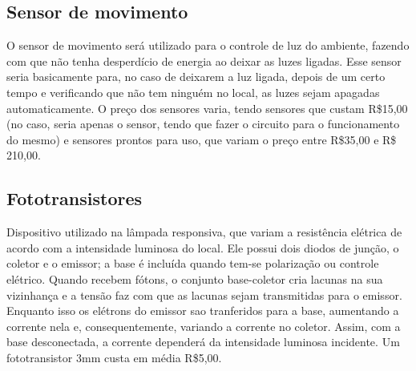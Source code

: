 \subsection{Sensor de movimento}

O sensor de movimento será utilizado para o controle de luz do ambiente, fazendo com que não tenha desperdício de energia ao deixar as luzes ligadas. Esse sensor seria basicamente para, no caso de deixarem a luz ligada, depois de um certo tempo e verificando que não tem ninguém no local, as luzes sejam apagadas automaticamente. O preço dos sensores varia, tendo sensores que custam R\$15,00 (no caso, seria apenas o sensor, tendo que fazer o circuito para o funcionamento do mesmo) e sensores prontos para uso, que variam o preço entre R\$35,00 e R\$ 210,00.

\subsection{Fototransistores}

Dispositivo utilizado na lâmpada responsiva, que variam a resistência elétrica de acordo com a intensidade luminosa do local. Ele possui dois diodos de junção, o coletor e o emissor; a base é incluída quando tem-se polarização ou controle elétrico. Quando recebem fótons, o conjunto base-coletor cria lacunas na sua vizinhança e a tensão faz com que as lacunas sejam transmitidas para o emissor. Enquanto isso os elétrons do emissor sao tranferidos para a base, aumentando a corrente nela e, consequentemente, variando a corrente no coletor. Assim, com a base desconectada, a corrente dependerá da intensidade luminosa incidente. Um fototransistor 3mm custa em média R\$5,00.

